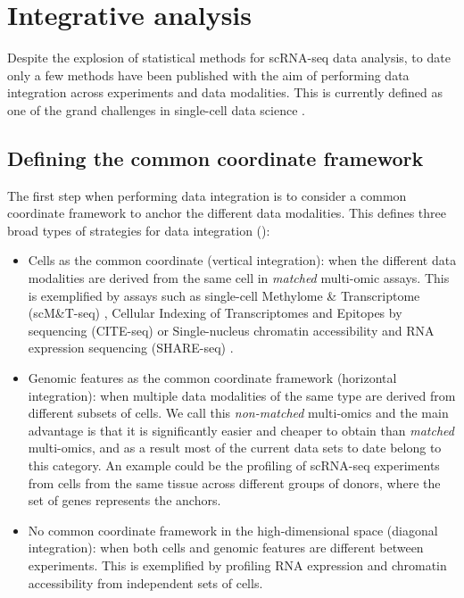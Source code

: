 \section{Integrative analysis}

Despite the explosion of statistical methods for scRNA-seq data analysis, to date only a few methods have been published with the aim of performing data integration across experiments and data modalities. This is currently defined as one of the grand challenges in single-cell data science \cite{Lahnemann2020}.

\subsection{Defining the common coordinate framework}

The first step when performing data integration is to consider a common coordinate framework to anchor the different data modalities. This defines three broad types of strategies for data integration (): 

\begin{itemize}

	\item Cells as the common coordinate (vertical integration): when the different data modalities are derived from the same cell in \textit{matched} multi-omic assays. This is exemplified by assays such as single-cell Methylome \& Transcriptome (scM\&T-seq) \cite{Angermueller2016}, Cellular Indexing of Transcriptomes and Epitopes by sequencing (CITE-seq) \cite{Stoeckius2017} or Single-nucleus chromatin accessibility and RNA expression sequencing (SHARE-seq) \cite{Ma2020}.

	\item Genomic features as the common coordinate framework (horizontal integration): when multiple data modalities of the same type are derived from different subsets of cells. We call this \textit{non-matched} multi-omics and the main advantage is that it is significantly easier and cheaper to obtain than \textit{matched} multi-omics, and as a result most of the current data sets to date belong to this category. An example could be the profiling of scRNA-seq experiments from cells from the same tissue across different groups of donors, where the set of genes represents the anchors.

	\item No common coordinate framework in the high-dimensional space (diagonal integration): when both cells and genomic features are different between experiments. This is exemplified by profiling RNA expression and chromatin accessibility from independent sets of cells.

\end{itemize}

